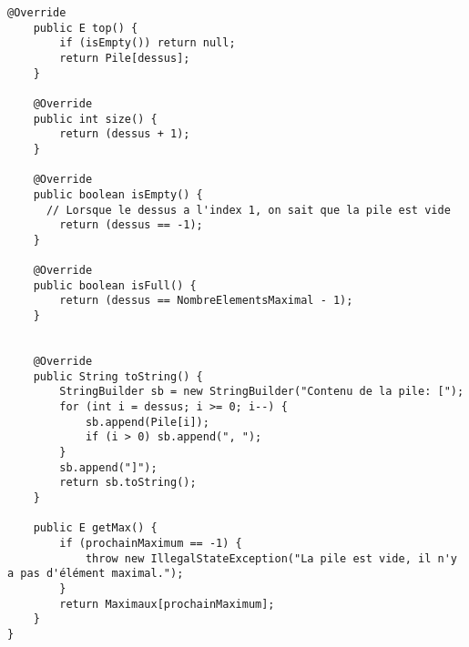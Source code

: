 \documentclass[10pt]{report}
\begin{document}
\begin{lstlisting}[style=JavaDraculaWhite]
    @Override
    public E top() {
        if (isEmpty()) return null;
        return Pile[dessus];
    }

    @Override
    public int size() {
        return (dessus + 1);
    }

    @Override
    public boolean isEmpty() {
      // Lorsque le dessus a l'index 1, on sait que la pile est vide
        return (dessus == -1);
    }

    @Override 
    public boolean isFull() {
        return (dessus == NombreElementsMaximal - 1);
    }


    @Override
    public String toString() {
        StringBuilder sb = new StringBuilder("Contenu de la pile: [");
        for (int i = dessus; i >= 0; i--) {
            sb.append(Pile[i]);
            if (i > 0) sb.append(", ");
        }
        sb.append("]");
        return sb.toString();
    }

    public E getMax() {
        if (prochainMaximum == -1) {
            throw new IllegalStateException("La pile est vide, il n'y a pas d'élément maximal.");
        }
        return Maximaux[prochainMaximum];
    }  
}      
    \end{lstlisting}















\end{document}
